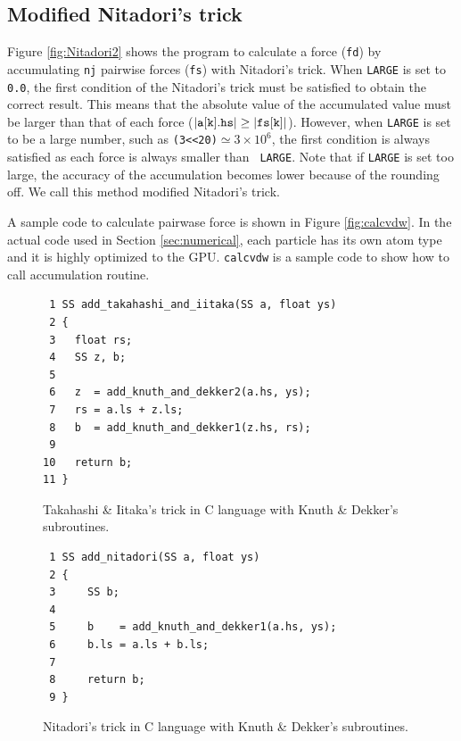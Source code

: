 \subsection{Modified Nitadori's trick}

Figure \ref{fig:Nitadori2} shows the program to calculate a force
({\tt fd}) by accumulating {\tt nj} pairwise forces ({\tt fs}) with
Nitadori's trick. 
When {\tt LARGE} is set to {\tt 0.0}, the first
condition of the Nitadori's trick must be satisfied to obtain the
correct result. This means that the absolute value of the accumulated
value must be larger than that of each force ($|{\tt a[k].hs}|\geq |{\tt
fs[k]}|$). However, when {\tt LARGE} is set to be a large number,
such as {\tt (3<<20)}$\simeq 3 \times 10^6$, the first condition is
always satisfied as each force is always smaller than {\tt
LARGE}. Note that if {\tt LARGE} is set too large, the
accuracy of the accumulation becomes lower because of the rounding
off. We call this method modified Nitadori's trick. 

A sample code to calculate pairwase force is shown in Figure \ref{fig:calcvdw}.
In the actual code used in Section \ref{sec:numerical}, 
each particle has its own atom type and it is highly optimized to the GPU.
{\tt calcvdw} is a sample code to show how to call accumulation
routine.

\begin{figure}
\begin{center}\footnotesize
\begin{minipage}{100mm}\def\baselinestretch{0.8}
\vspace*{-3mm}
\begin{verbatim}
 1 SS add_takahashi_and_iitaka(SS a, float ys)
 2 {
 3   float rs;
 4   SS z, b;
 5 
 6   z  = add_knuth_and_dekker2(a.hs, ys);
 7   rs = a.ls + z.ls;
 8   b  = add_knuth_and_dekker1(z.hs, rs);
 9 
10   return b;
11 }
\end{verbatim}\def\baselinestretch{1.0}
\end{minipage}
\caption{Takahashi \& Iitaka's trick in C language with Knuth \& Dekker's subroutines.}
\label{fig:TaI2}
\end{center}
\end{figure}

\begin{figure}
\begin{center}\footnotesize
\begin{minipage}{100mm}\def\baselinestretch{0.8}
\vspace*{-4mm}
\begin{verbatim}
 1 SS add_nitadori(SS a, float ys)
 2 {
 3     SS b;
 4 
 5     b    = add_knuth_and_dekker1(a.hs, ys);
 6     b.ls = a.ls + b.ls;
 7 
 8     return b;
 9 }
\end{verbatim}\def\baselinestretch{1.0}
\end{minipage}
\caption{Nitadori's trick in C language with Knuth \& Dekker's subroutines.}
\label{fig:Nitadori1}
\end{center}
\end{figure}

